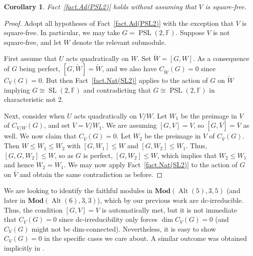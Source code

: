 \documentclass[a4paper, 11pt]{amsart}
\theoremstyle{plain}
\newtheorem{corollary}[theorem]{Corollary}
\theoremstyle{definition}
\theoremstyle{remark}
\DeclareMathOperator{\Alt}{Alt}
\DeclareMathOperator{\PSL}{PSL}
\DeclareMathOperator{\SL}{SL}
\newcommand{\Mod}{\mathbf{Mod}}
\newcommand{\bF}{\mathbb{F}}
\begin{document}
\begin{corollary}\label{cor.Ad(PSL2)}
Fact~\ref{fact.Ad(PSL2)} holds without assuming that $V$ is square-free.
\end{corollary}
\begin{proof}
Adopt all hypotheses of Fact~\ref{fact.Ad(PSL2)} with the exception that $V$ is square-free. In particular, we may take $G= \PSL(2,\bF)$.
Suppose $V$ is not square-free, and let $W$ denote the relevant submodule.

First assume that $U$ acts quadratically on $W$. Set $\check W = [G,W]$. As a consequence of $G$ being perfect, $[G,\check W] = \check W$, and we also have $C_{\check W}(G) = 0$ since $C_V(G) = 0$. But then Fact~\ref{fact.Nat(SL2)} applies to the action of $G$ on $\check W$ implying  $G\cong \SL(2,\bF)$ and  contradicting that $G\cong \PSL(2,\bF)$ in characteristic not $2$.

Next, consider when $U$ acts quadratically on $V/W$. 
Let $W_1$ be the preimage in $V$ of $C_{V/W}(G)$, and set $\overline{V} = V/W_1$. We are assuming $[G,V] = V$, so $[G,\overline{V}] = \overline{V}$ as well. We now claim that $C_{\overline{V}}(G) = 0$. Let $W_2$ be the preimage in $V$ of $C_{\overline{V}}(G)$. Then $W \le W_1 \le W_2$ with $[G,W_1]\le W$ and $[G,W_2]\le W_1$. Thus, $[G,G,W_2] \le W$, so as $G$ is perfect, $[G,W_2] \le W$, which implies that $W_2 \le W_1$ and hence $W_2 = W_1$. We may now apply Fact~\ref{fact.Nat(SL2)} to the action of $G$ on $\overline{V}$ and obtain the same contradiction as before. 
\end{proof}

We are looking to identify the faithful modules in $\Mod(\Alt(5),3,5)$ (and later in $\Mod(\Alt(6),3,3)$), which by our previous work are dc-irreducible. Thus, the condition  $[G,V] = V$ is automatically met, but it is not immediate that $C_V(G) = 0$ since dc-irreducibility only forces $\dim C_V(G) = 0$ (and $C_V(G)$ might not be dim-connected). Nevertheless, it is easy to show $C_V(G) = 0$ in the specific cases we care about.
A similar outcome was obtained implicitly in \cite{CDW23}.
\end{document}
